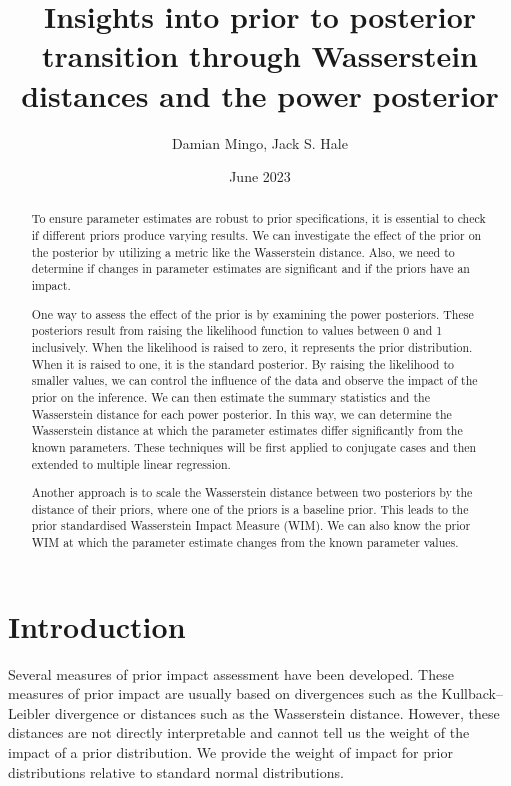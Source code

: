 \documentclass[12pt]{article}
\title{Insights into prior to posterior transition through Wasserstein
distances and the power posterior}
\author{Damian Mingo, Jack S. Hale}
\date{June 2023}
\begin{document}
\maketitle


\begin{abstract}

To ensure parameter estimates are robust to prior specifications, it is
essential to check if different priors produce varying results. We can
investigate the effect of the prior on the posterior by utilizing a
metric like the Wasserstein distance. Also, we need to determine if
changes in parameter estimates are significant and if the priors have
an impact.

One way to assess the effect of the prior is by examining the power
posteriors. These posteriors result from raising the likelihood
function to values between 0 and 1 inclusively. When the likelihood is
raised to zero, it represents the prior distribution. When it is raised
to one, it is the standard posterior. By raising the likelihood to
smaller values, we can control the influence of the data and observe
the impact of the prior on the inference. We can then estimate the
summary statistics and the Wasserstein distance for each power
posterior. In this way, we can determine the Wasserstein distance at
which the parameter estimates differ significantly from the known
parameters. These techniques will be first applied to conjugate cases
and then extended to multiple linear regression.

Another approach is to scale the Wasserstein distance between two
posteriors by the distance of their priors, where one of the priors is
a baseline prior. This leads to the prior standardised Wasserstein
Impact Measure (WIM). We can also know the prior WIM at which the
parameter estimate changes from the known parameter values. 
\end{abstract}

\section{Introduction}

Several measures of prior impact assessment have been developed. These measures
of prior impact are usually based on divergences such as the Kullback–Leibler
divergence or distances such as the Wasserstein distance. However, these
distances are not directly interpretable and cannot tell us the weight of the
impact of a prior distribution. We provide the weight of impact for prior
distributions relative to standard normal distributions.
\end{document}
